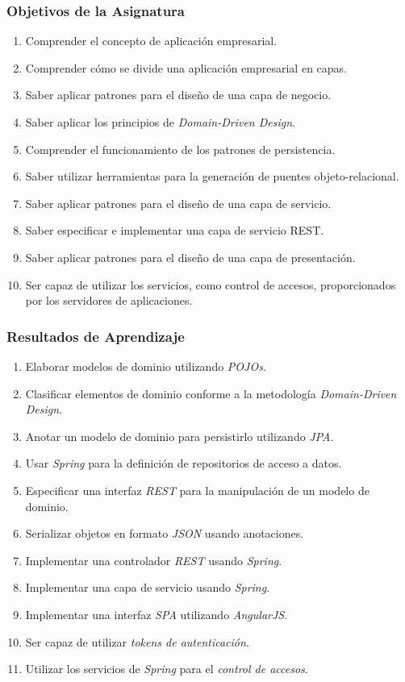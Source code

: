 \documentclass[a4paper,t,xcolor=pst,dvips,colortheme]{beamer}
\begin{document}
\begin{frame}[c]
   \frametitle{Objetivos de la Asignatura}
   \begin{enumerate}[<+->]
        \item Comprender el concepto de aplicación empresarial.
        \item Comprender cómo se divide una aplicación empresarial en capas.
        \item Saber aplicar patrones para el diseño de una capa de negocio.
        \item Saber aplicar los principios de \emph{Domain-Driven Design}.
        \item Comprender el funcionamiento de los patrones de persistencia.
        \item Saber utilizar herramientas para la generación de puentes objeto-relacional.
        \item Saber aplicar patrones para el diseño de una capa de servicio.
        \item Saber especificar e implementar una capa de servicio REST.
        \item Saber aplicar patrones para el diseño de una capa de presentación.
        \item Ser capaz de utilizar los servicios, como control de accesos, proporcionados por los servidores de aplicaciones.
	\end{enumerate}
\end{frame}

\begin{frame}[c]
   \frametitle{Resultados de Aprendizaje}
   \begin{enumerate}[<+->]
        \item Elaborar modelos de dominio utilizando \emph{POJOs}.
        \item Clasificar elementos de dominio conforme a la metodología \emph{Domain-Driven Design}.
        \item Anotar un modelo de dominio para persistirlo utilizando \emph{JPA}.
        \item Usar \emph{Spring} para la definición de repositorios de acceso a datos.
        \item Especificar una interfaz \emph{REST} para la manipulación de  un modelo de dominio.
        \item Serializar objetos en formato \emph{JSON} usando anotaciones.
        \item Implementar una controlador \emph{REST} usando \emph{Spring}.
        \item Implementar una capa de servicio usando \emph{Spring}.
        \item Implementar una interfaz \emph{SPA} utilizando \emph{AngularJS}.
        \item Ser capaz de utilizar \emph{tokens de autenticación}.
        \item Utilizar los servicios de \emph{Spring} para el \emph{control de accesos}.
	\end{enumerate}
\end{frame}
\end{document}
